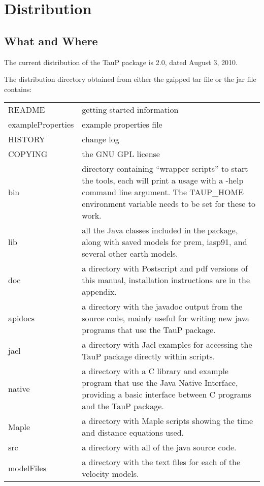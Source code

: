 
\section{Distribution}


\subsection{What and Where}
The current distribution of the TauP package is 2.0, dated August 3, 2010.

The distribution directory obtained from either the gzipped tar file or the jar file contains:

\begin{center}
\begin{tabular}{lp{4in}}
README & getting started information \\
exampleProperties & example properties file \\
HISTORY & change log \\
COPYING & the GNU GPL license \\
bin & directory containing ``wrapper scripts'' to start the tools,
   each will print a usage with a -help command line argument.
   The TAUP\_HOME environment variable needs to be set for these to work.\\
lib & all the Java classes included in the package, along with
               saved models for prem, iasp91, and several other earth models. \\
doc & a directory with Postscript and pdf versions of this manual,
installation instructions are in the appendix. \\
apidocs & a directory with the javadoc output from
the source code, mainly useful
for writing new java programs that use the TauP package. \\
jacl & a directory with Jacl examples for accessing the TauP package directly within scripts. \\
native & a directory with a C library and example program that use the
Java Native Interface, providing a basic interface between C programs
and the TauP package. \\
Maple & a directory with Maple scripts showing the time and distance equations
used. \\
src & a directory with all of the java source code. \\
modelFiles & a directory with the text files for each of the velocity models.
\end{tabular}
\end{center}

